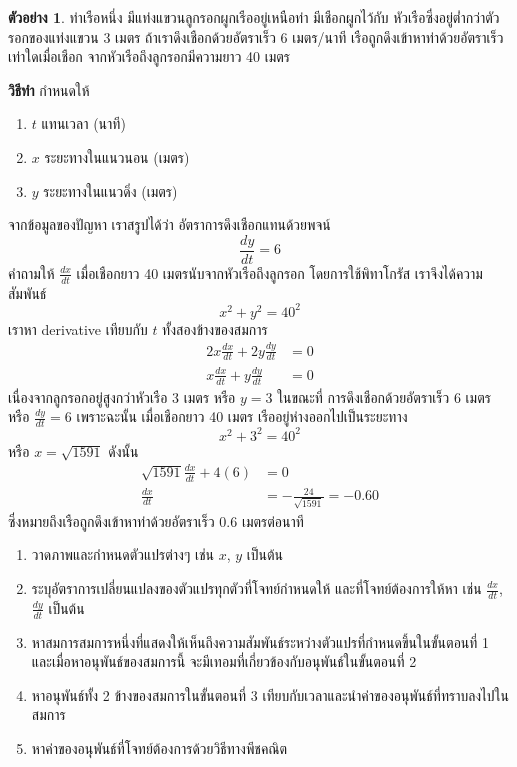 \documentclass[
]{book}
\theoremstyle{definition}
\theoremstyle{definition}
\newtheorem{example}{ตัวอย่าง}[chapter]
\theoremstyle{definition}
\theoremstyle{definition}
\theoremstyle{remark}
\begin{document}
\begin{example}
ท่าเรือหนึ่ง มีแท่งแขวนลูกรอกผูกเรืออยู่เหนือท่า มีเชือกผูกไว้กับ
หัวเรือซึ่งอยู่ต่ำกว่าตัวรอกของแท่งแขวน 3 เมตร ถ้าเราดึงเชือกด้วยอัตราเร็ว 6 เมตร/นาที
เรือถูกดึงเข้าหาท่าด้วยอัตราเร็วเท่าใดเมื่อเชือก จากหัวเรือถึงลูกรอกมีความยาว 40 เมตร
\end{example}

\textbf{วิธีทำ} กำหนดให้

\begin{enumerate}
\def\labelenumi{\arabic{enumi}.}
\item
  \(t\) แทนเวลา (นาที)
\item
  \(x\) ระยะทางในแนวนอน (เมตร)
\item
  \(y\) ระยะทางในแนวดิ่ง (เมตร)
\end{enumerate}

จากข้อมูลของปัญหา เราสรูปได้ว่า อัตราการดึงเชือกแทนด้วยพจน์ \[\frac{dy}{dt} = 6\]
คำถามให้ \(\frac{dx}{dt}\) เมื่อเชือกยาว 40 เมตรนับจากหัวเรือถึงลูกรอก
โดยการใช้พิทาโกรัส เราจึงได้ความสัมพันธ์ \[x^2+y^2 = 40^2\] เราหา derivative
เทียบกับ \(t\) ทั้งสองข้างของสมการ \begin{equation}   \begin{aligned}
    2x \frac{dx}{dt} + 2y\frac{dy}{dt} &= 0 \\
    x \frac{dx}{dt} + y\frac{dy}{dt} &= 0
  \end{aligned} \end{equation} เนื่องจากลูกรอกอยู่สูงกว่าหัวเรือ 3 เมตร หรือ \(y=3\)
ในขณะที่ การดึงเชือกด้วยอัตราเร็ว 6 เมตร หรือ \(\frac{dy}{dt} = 6\) เพราะฉะนั้น
เมื่อเชือกยาว 40 เมตร เรืออยู่ห่างออกไปเป็นระยะทาง \[x^2 + 3^2 = 40^2\] หรือ
\(x = \sqrt{1591}\) ดังนั้น \begin{equation}   \begin{aligned}
    \sqrt{1591}\frac{dx}{dt} + 4(6) &= 0 \\
    \frac{dx}{dt} &= -\frac{24}{\sqrt{1591}} = -0.60
  \end{aligned} \end{equation} ซึ่งหมายถึงเรือถูกดึงเข้าหาท่าด้วยอัตราเร็ว 0.6
เมตรต่อนาที

\begin{enumerate}
\def\labelenumi{\arabic{enumi}.}
\item
  วาดภาพและกำหนดตัวแปรต่างๆ เช่น \(x\), \(y\) เป็นต้น
\item
  ระบุอัตราการเปลี่ยนแปลงของตัวแปรทุกตัวที่โจทย์กำหนดให้ และที่โจทย์ต้องการให้หา เช่น
  \(\displaystyle\frac{dx}{dt}\), \(\displaystyle\frac{dy}{dt}\) เป็นต้น
\item
  หาสมการสมการหนึ่งที่แสดงให้เห็นถึงความสัมพันธ์ระหว่างตัวแปรที่กำหนดขึ้นในขั้นตอนที่ 1
  และเมื่อหาอนุพันธ์ของสมการนี้ จะมีเทอมที่เกี่ยวข้องกับอนุพันธ์ในขั้นตอนที่ 2
\item
  หาอนุพันธ์ทั้ง 2 ข้างของสมการในขั้นตอนที่ 3
  เทียบกับเวลาและนำค่าของอนุพันธ์ที่ทราบลงไปในสมการ
\item
  หาค่าของอนุพันธ์ที่โจทย์ต้องการด้วยวิธีทางพีชคณิต
\end{enumerate}
\end{document}
